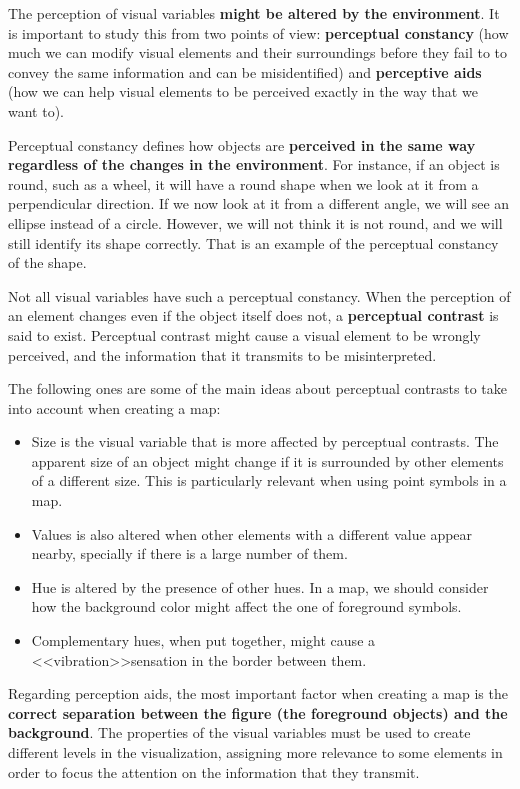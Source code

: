 The perception of visual variables \textbf{might be altered by the environment}. It is important to study this from two points of view: \textbf{perceptual constancy} (how much we can modify visual elements and their surroundings before they fail to to convey the same information and can be misidentified) and \textbf{perceptive aids} (how we can help visual elements to be perceived exactly in the way that we want to).

Perceptual constancy defines how objects are \textbf{perceived in the same way regardless of the changes in the environment}. For instance, if an object is round, such as a wheel, it will have a round shape when we look at it from a perpendicular direction. If we now look at it from a different angle, we will see an ellipse instead of a circle. However, we will not think it is not round, and we will still identify its shape correctly. That is an example of the perceptual constancy of the shape.

Not all visual variables have such a perceptual constancy. When the perception of an element changes even if the object itself does not, a \textbf{perceptual contrast} is said to exist. Perceptual contrast might cause a visual element to be wrongly perceived, and the information that it transmits to be misinterpreted.

The following ones are some of the main ideas about perceptual contrasts to take into account when creating a map:

\begin{itemize}
	\item Size is the visual variable that is more affected by perceptual contrasts. The apparent size of an object might change if it is surrounded by other elements of a different size. This is particularly relevant when using point symbols in a map.	
	\item Values is also altered when other elements with a different value appear nearby, specially if there is a large number of them.
	\item Hue is altered by the presence of other hues. In a map, we should consider how the background color might affect the one of foreground symbols. 
	\item Complementary hues, when put together, might cause a <<vibration>>sensation in the border between them.
\end{itemize}

Regarding perception aids, the most important factor when creating a map is the \textbf{correct separation between the figure (the foreground objects) and the background}. The properties of the visual variables must be used to create different levels in the visualization, assigning more relevance to some elements in order to focus the attention on the information that they transmit.


